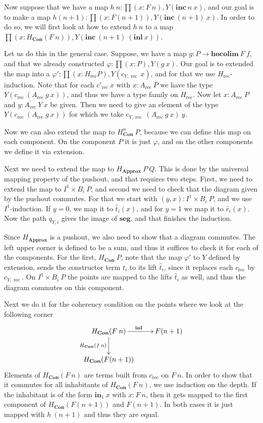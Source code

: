 \documentclass[a4paper,UKenglish]{lipics-v2016}
\newcommand{\Boperator}[1]{\mathrm{\mathbf{#1}}}
\newcommand{\inn}{\Boperator{in}}
\newcommand{\rec}[0]{\operatorname{rec}}
\newcommand{\Con}[0]{\textbf{Con}}
\newcommand{\Approx}[0]{\textbf{Approx}}
\newcommand{\hocolim}[0]{\Boperator{hocolim}}
\newcommand{\seg}[0]{\Boperator{seg}}
\newcommand{\inl}[0]{\Boperator{inl}}
\newcommand{\inc}[0]{\Boperator{inc}}
\newcommand{\dak}[1]{\widehat{#1}}
\newcommand{\hatt}{\dak{t}}
\newcommand{\hatr}{\dak{r}}
\begin{document}
Now suppose that we have a map $h \> n : \prod (x : F \> n), Y(\inc \> n \> x)$, and our goal is to make a map $h(n+1) : \prod  (x : F(n+1)), Y(\inc \> (n+1) \> x)$.
In order to do so, we will first look at how to extend $h \> n$ to a map $\prod (x : H_{\Con} (F \> n)), Y(\inc \> (n+1) \> (\inl \> x))$.

Let us do this in the general case.
Suppose, we have a map $g : P \rightarrow \hocolim \> F \> f$, and that we already constructed $\varphi : \prod (x : P), Y(g \> x)$.
Our goal is to extended the map into a $\varphi' : \prod (x : H_{\rec} P), Y(c_{Y, \rec} \> x)$, and for that we use $H_{\rec}$-induction.
Note that for each $c'_{\rec} \> x$ with $x : A_{\rec} \> P$ we have the type $Y(c_{\rec} \> (A_{\rec} \> g \> x))$, and thus we have a type family on $H_{\rec}$.
Now let $x : A_{\rec} \> P$ and $y : \overline{A_{\rec}} \> Y \> x$ be given.
Then we need to give an element of the type $Y(c_{\rec} \> (A_{\rec} \> g \> x))$ for which we take $c_{Y,\rec} \> (A_{\rec} \> g \> x) \> y$.

Now we can also extend the map to $H_{\Con}^n \> P$, because we can define this map on each component.
On the component $P$ it is just $\varphi$, and on the other components we define it via extension.

Next we need to extend the map to $H_{\Approx} \> P \> Q$.
This is done by the universal mapping property of the pushout, and that requires two steps.
First, we need to extend the map to $I^1 \times B_i \> P$, and second we need to check that the diagram given by the pushout commutes.
For that we start with $(y, x) : I^1 \times B_i \> P$, and we use $I^1$-induction.
If $y = 0$, we map it to $\hatt_i (x)$, and for $y = 1$ we map it to $\hatr_i (x)$.
Now the path $q_{Y, i}$ gives the image of $\seg$, and that finishes the induction.

Since $H_{\Approx}$ is a pushout, we also need to show that a diagram commutes.
The left upper corner is defined to be a sum, and thus it suffices to check it for each of the components.
For the first, $H_{\Con} \> P$, note that the map $\varphi'$ to $Y$ defined by extension, sends the constructor term $t_i$ to its lift $\hatt_i$, since it replaces each $c_{\rec}$ by $c_{Y, \rec}$.
On $I^1 \times B_i \> P$ the points are mapped to the lifts $\hatt_i$ as well, and thus the diagram commutes on this component.

Next we do it for the coherency condition on the points where we look at the following corner
\[
\xymatrix
{
	H_{\Con}(F \> n) \ar[r]^{\inl} \ar[d]_{H_{\Con} (f \> n)} & F(n+1)\\
	H_{\Con} (F(n+1))
}
\]
Elements of $H_{\Con}(F \> n)$ are terms built from $c_{\rec}$ on $F \> n$.
In order to show that it commutes for all inhabitants of $H_{\Con}(F \> n)$, we use induction on the depth.
If the inhabitant is of the form $\inn_1 \> x$ with $x : F \> n$, then it gets mapped to the first component of $H_{\Con} (F(n+1))$ and $F(n+1)$.
In both cases it is just mapped with $h \> (n+1)$ and thus they are equal.
\end{document}
